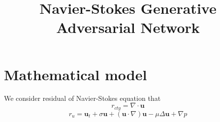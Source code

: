 \documentclass[12pt]{article} %
\newcommand{\bu}{\bm{u}}
\begin{document}
\title{Navier-Stokes Generative Adversarial Network}
\date{}
\maketitle
\section{Mathematical model}
We consider residual of Navier-Stokes equation that
\begin{equation}
    r_{cty} = \nabla \cdot \bu
\end{equation}
\begin{equation}
    r_{u} = \bu_t + \sigma \bu + (\bu \cdot \nabla)\bu  - \mu\Delta\bu + \nabla p
\end{equation}
\end{document}

